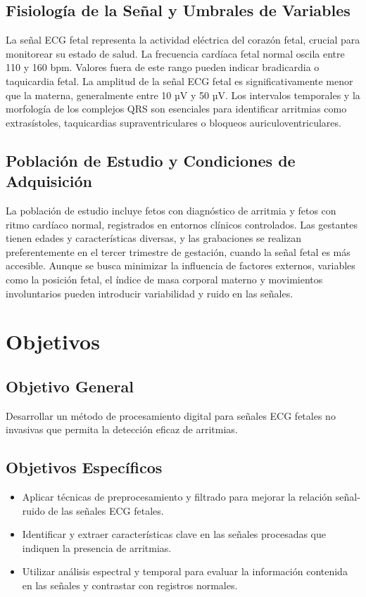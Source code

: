 \documentclass[10pt, conference]{IEEEtran}
\begin{document}
\subsection{Fisiología de la Señal y Umbrales de Variables}

La señal ECG fetal representa la actividad eléctrica del corazón fetal, crucial para monitorear su estado de salud. La frecuencia cardíaca fetal normal oscila entre 110 y 160 bpm. Valores fuera de este rango pueden indicar bradicardia o taquicardia fetal. La amplitud de la señal ECG fetal es significativamente menor que la materna, generalmente entre 10 µV y 50 µV. Los intervalos temporales y la morfología de los complejos QRS son esenciales para identificar arritmias como extrasístoles, taquicardias supraventriculares o bloqueos auriculoventriculares.

\subsection{Población de Estudio y Condiciones de Adquisición}

La población de estudio incluye fetos con diagnóstico de arritmia y fetos con ritmo cardíaco normal, registrados en entornos clínicos controlados. Las gestantes tienen edades y características diversas, y las grabaciones se realizan preferentemente en el tercer trimestre de gestación, cuando la señal fetal es más accesible. Aunque se busca minimizar la influencia de factores externos, variables como la posición fetal, el índice de masa corporal materno y movimientos involuntarios pueden introducir variabilidad y ruido en las señales.

\section{Objetivos}

\subsection{Objetivo General}

Desarrollar un método de procesamiento digital para señales ECG fetales no invasivas que permita la detección eficaz de arritmias.

\subsection{Objetivos Específicos}

\begin{itemize}
	\item Aplicar técnicas de preprocesamiento y filtrado para mejorar la relación señal-ruido de las señales ECG fetales.
	\item Identificar y extraer características clave en las señales procesadas que indiquen la presencia de arritmias.
	\item Utilizar análisis espectral y temporal para evaluar la información contenida en las señales y contrastar con registros normales.
\end{itemize}
\end{document}
